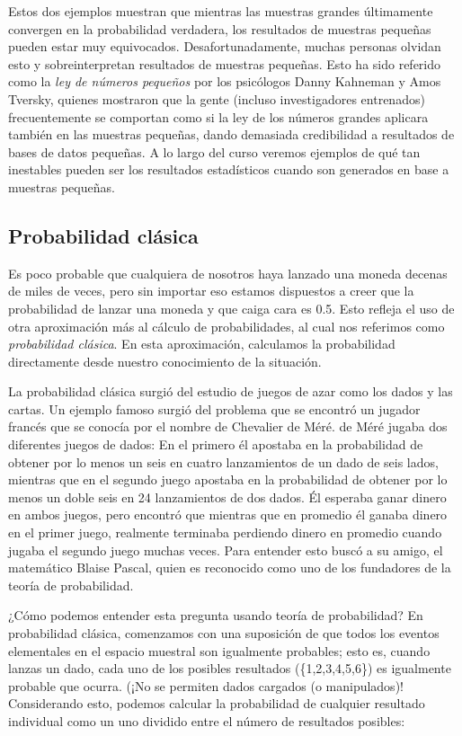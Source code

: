 \documentclass[
  12pt,
]{book}
\theoremstyle{definition}
\theoremstyle{definition}
\theoremstyle{definition}
\theoremstyle{remark}
\begin{document}
Estos dos ejemplos muestran que mientras las muestras grandes últimamente convergen en la probabilidad verdadera, los resultados de muestras pequeñas pueden estar muy equivocados. Desafortunadamente, muchas personas olvidan esto y sobreinterpretan resultados de muestras pequeñas. Esto ha sido referido como la \emph{ley de números pequeños} por los psicólogos Danny Kahneman y Amos Tversky, quienes mostraron que la gente (incluso investigadores entrenados) frecuentemente se comportan como si la ley de los números grandes aplicara también en las muestras pequeñas, dando demasiada credibilidad a resultados de bases de datos pequeñas. A lo largo del curso veremos ejemplos de qué tan inestables pueden ser los resultados estadísticos cuando son generados en base a muestras pequeñas.

\hypertarget{probabilidad-cluxe1sica}{%
\subsection{Probabilidad clásica}\label{probabilidad-cluxe1sica}}

Es poco probable que cualquiera de nosotros haya lanzado una moneda decenas de miles de veces, pero sin importar eso estamos dispuestos a creer que la probabilidad de lanzar una moneda y que caiga cara es 0.5. Esto refleja el uso de otra aproximación más al cálculo de probabilidades, al cual nos referimos como \emph{probabilidad clásica}. En esta aproximación, calculamos la probabilidad directamente desde nuestro conocimiento de la situación.

La probabilidad clásica surgió del estudio de juegos de azar como los dados y las cartas. Un ejemplo famoso surgió del problema que se encontró un jugador francés que se conocía por el nombre de Chevalier de Méré. de Méré jugaba dos diferentes juegos de dados: En el primero él apostaba en la probabilidad de obtener por lo menos un seis en cuatro lanzamientos de un dado de seis lados, mientras que en el segundo juego apostaba en la probabilidad de obtener por lo menos un doble seis en 24 lanzamientos de dos dados. Él esperaba ganar dinero en ambos juegos, pero encontró que mientras que en promedio él ganaba dinero en el primer juego, realmente terminaba perdiendo dinero en promedio cuando jugaba el segundo juego muchas veces. Para entender esto buscó a su amigo, el matemático Blaise Pascal, quien es reconocido como uno de los fundadores de la teoría de probabilidad.

¿Cómo podemos entender esta pregunta usando teoría de probabilidad? En probabilidad clásica, comenzamos con una suposición de que todos los eventos elementales en el espacio muestral son igualmente probables; esto es, cuando lanzas un dado, cada uno de los posibles resultados (\{1,2,3,4,5,6\}) es igualmente probable que ocurra. (¡No se permiten dados cargados (o manipulados)! Considerando esto, podemos calcular la probabilidad de cualquier resultado individual como un uno dividido entre el número de resultados posibles:
\end{document}
